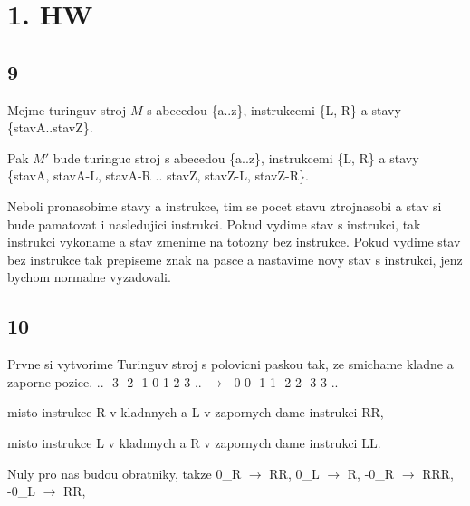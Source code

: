 \documentclass[a4paper]{article}
\begin{document}
\pagestyle{fancy}

\section*{1. HW}
\subsection*{9}
Mejme turinguv stroj $M$ s abecedou \{a..z\}, instrukcemi \{L, R\} a stavy \{stavA..stavZ\}.

Pak $M'$ bude turinguc stroj s abecedou \{a..z\}, instrukcemi \{L, R\} a stavy \{stavA, stavA-L, stavA-R .. stavZ, stavZ-L, stavZ-R\}.  

Neboli pronasobime stavy a instrukce, tim se pocet stavu ztrojnasobi a stav si bude pamatovat i nasledujici instrukci.  
Pokud vydime stav s instrukci, tak instrukci vykoname a stav zmenime na totozny bez instrukce.
Pokud vydime stav bez instrukce tak prepiseme znak na pasce a nastavime novy stav s instrukci, jenz bychom normalne vyzadovali.

\subsection*{10}
Prvne si vytvorime Turinguv stroj s polovicni paskou tak, ze smichame kladne a zaporne pozice.  
.. -3 -2 -1 0 1 2 3 .. $\rightarrow$ -0 0 -1 1 -2 2 -3 3 ..  

misto instrukce R v kladnnych a L v zapornych dame instrukci RR,  

misto instrukce L v kladnnych a R v zapornych dame instrukci LL.

Nuly pro nas budou obratniky, takze 
0\_R $\rightarrow$ RR, 
0\_L $\rightarrow$ R, 
-0\_R $\rightarrow$ RRR, 
-0\_L $\rightarrow$ RR, 
\end{document}
